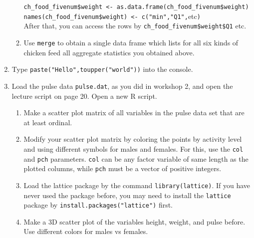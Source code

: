 \begin{enumerate}
\begin{enumerate}
    \texttt{ch\_food\_fivenum\$weight <- as.data.frame(ch\_food\_fivenum\$weight)}\\
    \texttt{names(ch\_food\_fivenum\$weight) <- c("min","Q1",}etc\texttt{)}\\
    After that, you can access the rows by \texttt{ch\_food\_fivenum\$weight\$Q1} etc.
\item Use \texttt{merge} to obtain a single data frame which lists for all six kinds of chicken feed all aggregate statistics you obtained above.
\end{enumerate}

\item Type \texttt{paste("Hello",toupper("world"))} into the console.

\item Load the pulse data \texttt{pulse.dat}, as you did in workshop 2, and open the lecture script on page 20. Open a new R script.
\begin{enumerate}
\item Make a scatter plot matrix of all variables in the pulse data set that are at least ordinal.
\item Modify your scatter plot matrix by coloring the points by activity level and using different symbols for males and females. For this, use the \texttt{col} and \texttt{pch} parameters. \texttt{col} can be any factor variable of same length as the plotted columns, while \texttt{pch} must be a vector of positive integers.
\item Load the lattice package by the command \texttt{library(lattice)}. If you have never used the package before, you may need to install the \texttt{lattice} package by \texttt{install.packages("lattice")} first.
\item Make a 3D scatter plot of the variables height, weight, and pulse before. Use different colors for males vs females.
\end{enumerate}



\end{enumerate}
